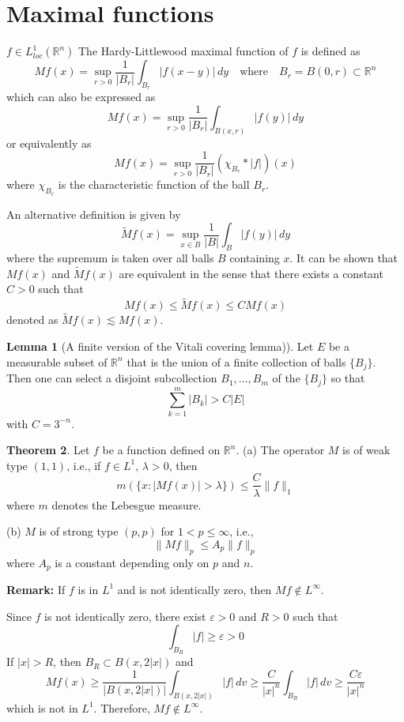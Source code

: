 \documentclass[12pt,openany]{book}
\theoremstyle{definition}
\newtheorem{theorem}{Theorem}[section]
\newtheorem{lemma}[theorem]{Lemma}
\begin{document}
\section{Maximal functions}
$f \in L_{loc}^1(\mathbb{R}^n)$ The Hardy-Littlewood maximal function of $f$ is defined as
$$
M f(x) = \sup_{r > 0} \frac{1}{|B_r|} \int_{B_r} |f(x - y)| \, dy \quad \text{where} \quad B_r = B(0, r) \subset \mathbb{R}^n
$$
which can also be expressed as
$$
M f(x) = \sup_{r > 0} \frac{1}{|B_r|} \int_{B(x, r)} |f(y)| \, dy
$$
or equivalently as
$$
M f(x) = \sup_{r > 0} \frac{1}{|B_r|} (\chi_{B_r} * |f|)(x)
$$
where $\chi_{B_r}$ is the characteristic function of the ball $B_r$.

An alternative definition is given by
$$
\tilde{M} f(x) = \sup_{x \in B} \frac{1}{|B|} \int_B |f(y)| \, dy
$$
where the supremum is taken over all balls $B$ containing $x$. It can be shown that $M f(x)$ and $\tilde{M} f(x)$ are equivalent in the sense that there exists a constant $C > 0$ such that
$$
M f(x) \leq \tilde{M} f(x) \leq C M f(x)
$$
denoted as $\tilde{M} f(x) \lesssim M f(x)$.
\begin{lemma}[A finite version of the Vitali covering lemma)]
    Let $E$ be a measurable subset of $\mathbb{R}^n$ that is the union of a finite collection of balls $\{B_j\}$. Then one can select a disjoint subcollection $B_1, \ldots, B_m$ of the $\{B_j\}$ so that
$$
\sum_{k=1}^m |B_k| > C |E|
$$
with $C = 3^{-n}$.
\end{lemma}
\begin{theorem}
    Let $f$ be a function defined on $\mathbb{R}^n$.
(a) The operator $M$ is of weak type $(1, 1)$, i.e., if $f \in L^1$, $\lambda > 0$, then
$$
m(\{x : |M f(x)| > \lambda\}) \leq \frac{C}{\lambda} \|f\|_1
$$
where $m$ denotes the Lebesgue measure.

(b) $M$ is of strong type $(p, p)$ for $1 < p \leq \infty$, i.e.,
$$
\|M f\|_p \leq A_p \|f\|_p
$$
where $A_p$ is a constant depending only on $p$ and $n$.
\end{theorem}
\noindent\textbf{Remark:} If $f$ is in $L^1$ and is not identically zero, then $M f \notin L^\infty$.

Since $f$ is not identically zero, there exist $\varepsilon > 0$ and $R > 0$ such that
$$
\int_{B_R} |f| \geq \varepsilon > 0
$$
If $|x| > R$, then $B_R \subset B(x, 2|x|)$ and
$$
M f(x) \geq \frac{1}{|B(x, 2|x|)|} \int_{B(x, 2|x|)} |f| \, dv \geq \frac{C}{|x|^n} \int_{B_R} |f| \, dv \geq \frac{C \varepsilon}{|x|^n}
$$
which is not in $L^1$. Therefore, $M f \notin L^\infty$.
\end{document}
